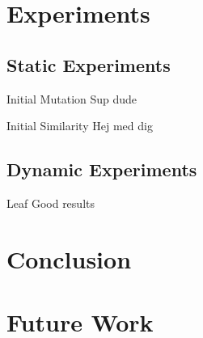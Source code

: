 
\section{Experiments}

\subsection{Static Experiments}
\begin{frame}{Initial Mutation}
  Sup dude
\end{frame}

\begin{frame}{Initial Similarity}
  Hej med dig
\end{frame}

\subsection{Dynamic Experiments}

\begin{frame}{Leaf}
 Good results 
\end{frame}

\section{Conclusion}
\section{Future Work}
